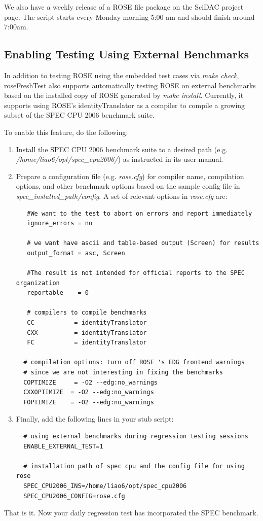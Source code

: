 We also have a weekly release of a ROSE file package on the SciDAC project page.
The script starts every Monday morning 5:00 am and should finish around 7:00am. 


\subsection{Enabling Testing Using External Benchmarks}
In addition to testing ROSE using the embedded test cases via \textit{make
check}, roseFreshTest also supports automatically testing ROSE on
external benchmarks based on the installed copy of ROSE generated by
\textit{make install}. 
Currently, it supports using ROSE's identityTranslator as a compiler to
compile a growing subset of the SPEC CPU 2006 benchmark suite. 

To enable this feature, do the following:
\begin{enumerate}
  \item Install the SPEC CPU 2006 benchmark suite to a desired path (e.g.
  \textit{/home/liao6/opt/spec\_cpu2006/}) as instructed in its user
  manual.
  \item Prepare a configuration file (e.g. \textit{rose.cfg}) for compiler name, compilation
  options, and other benchmark options based on the sample config file in
  \textit{spec\_installed\_path/config}. A set of relevant options in
  \textit{rose.cfg} are:
  \begin{verbatim}
   #We want to the test to abort on errors and report immediately
   ignore_errors = no

   # we want have ascii and table-based output (Screen) for results
   output_format = asc, Screen

   #The result is not intended for official reports to the SPEC organization
   reportable    = 0

   # compilers to compile benchmarks
   CC           = identityTranslator
   CXX          = identityTranslator
   FC           = identityTranslator

  # compilation options: turn off ROSE 's EDG frontend warnings 
  # since we are not interesting in fixing the benchmarks
  COPTIMIZE     = -O2 --edg:no_warnings
  CXXOPTIMIZE  = -O2 --edg:no_warnings
  FOPTIMIZE    = -O2 --edg:no_warnings
  \end{verbatim}
  \item Finally, add the following lines in your stub script:
  \begin{verbatim}
  # using external benchmarks during regression testing sessions
  ENABLE_EXTERNAL_TEST=1

  # installation path of spec cpu and the config file for using rose
  SPEC_CPU2006_INS=/home/liao6/opt/spec_cpu2006
  SPEC_CPU2006_CONFIG=rose.cfg
  \end{verbatim}
\end{enumerate}
That is it. Now your daily regression test has incorporated the SPEC
benchmark.

